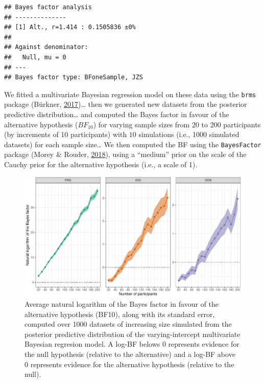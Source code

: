 \documentclass[
  english,
  man,floatsintext]{apa6}
\begin{document}
\begin{verbatim}
## Bayes factor analysis
## --------------
## [1] Alt., r=1.414 : 0.1505836 ±0%
## 
## Against denominator:
##   Null, mu = 0 
## ---
## Bayes factor type: BFoneSample, JZS
\end{verbatim}

We fitted a multivariate Bayesian regression model on these data using the \texttt{brms} package (Bürkner, \protect\hyperlink{ref-R-brms}{2017})\ldots{} then we generated new datasets from the posterior predictive distribution\ldots{} and computed the Bayes factor in favour of the alternative hypothesis (\(BF_{10}\)) for varying sample sizes from 20 to 200 participants (by increments of 10 participants) with \(10\) simulations (i.e., 1000 simulated datasets) for each sample size\ldots{} We then computed the BF using the \texttt{BayesFactor} package (Morey \& Rouder, \protect\hyperlink{ref-R-BayesFactor}{2018}), using a ``medium'' prior on the scale of the Cauchy prior for the alternative hypothesis (i.e., a scale of 1).

\begin{figure}[!htb]

{\centering \includegraphics[width=1\linewidth]{manuscript_files/figure-latex/simulated-power-1} 

}

\caption{Average natural logarithm of the Bayes factor in favour of the alternative hypothesis (BF10), along with its standard error, computed over 1000 datasets of increasing size simulated from the posterior predictive distribution of the varying-intercept multivariate Bayesian regresion model. A log-BF belows 0 represents evidence for the null hypothesis (relative to the alternative) and a log-BF above 0 represents evidence for the alternative hypothesis (relative to the null).}\label{fig:simulated-power}
\end{figure}
\end{document}
